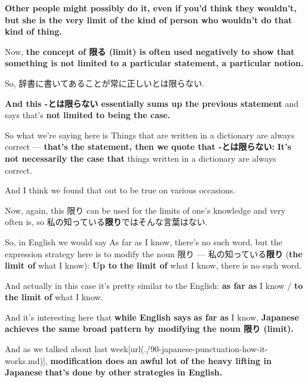 {\bf Other people might possibly do it, even if you'd think they wouldn't,} {\bf but she is the very limit of the kind of person who wouldn't do that kind of thing.}

\stopsectionlevel

\startsectionlevel[title={限る used negatively (not limited to x)},reference={限る-used-negatively-not-limited-to-x}]

Now, {\bf the concept of 限る (limit) is often used negatively to show that} {\bf something is not limited to a particular statement, a particular notion.}

So, 辞書に書いてあることが常に正しいとは限らない.

{}

{\bf And this -とは限らない essentially sums up the previous statement} and says that's {\bf not limited to being the case.}

So what we're saying here is Things that are written in a dictionary are always correct --- {\bf that's the statement, then we quote that -とは限らない:} {\bf It's not necessarily the case that} things written in a dictionary are always correct.

And I think we found that out to be true on various occasions.

\stopsectionlevel

\startsectionlevel[title={限り},reference={限り}]

Now, again, this 限り can be used for the limits of one's knowledge and very often is, so 私の知っている{\bf 限り}ではそんな言葉はない.

{}

So, in English we would say As far as I know, there's no such word, but the expression strategy here is to modify the noun 限り --- 私の知っている{\bf 限り} ({\bf the limit of} what I know): {\bf Up to the limit of} what I know, there is no such word.

And actually in this case it's pretty similar to the English: {\bf as far as} I know / {\bf to the limit of} what I know.

And it's interesting here that {\bf while English says} {\bf as far as} I know, {\bf Japanese achieves the same broad pattern by modifying the noun 限り (limit).}

And as we talked about last week\goto{{[}90{]}}[url(./90-japanese-punctuation-how-it-works.md)], {\bf modification does an awful lot of the heavy lifting in Japanese} {\bf that's done by other strategies in English.}

